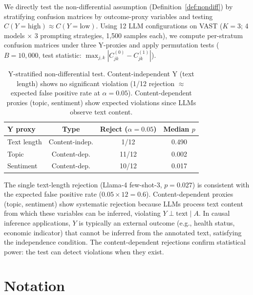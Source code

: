 We directly test the non-differential assumption (Definition~\ref{def:nondiff}) by stratifying confusion matrices by outcome-proxy variables and testing $C(Y{=}\text{high}) \approx C(Y{=}\text{low})$. Using 12 LLM configurations on VAST ($K{=}3$; 4 models $\times$ 3 prompting strategies, 1{,}500 samples each), we compute per-stratum confusion matrices under three Y-proxies and apply permutation tests ($B{=}10{,}000$, test statistic: $\max_{j,k} |C^{(0)}_{jk} - C^{(1)}_{jk}|$).

\begin{table}[h]
\centering
\small
\caption{Y-stratified non-differential test. Content-independent Y (text length) shows no significant violation (1/12 rejection $\approx$ expected false positive rate at $\alpha{=}0.05$). Content-dependent proxies (topic, sentiment) show expected violations since LLMs observe text content.}
\label{tab:y_stratified}
\begin{tabular}{lccc}
\toprule
\textbf{Y proxy} & \textbf{Type} & \textbf{Reject ($\alpha{=}0.05$)} & \textbf{Median $p$} \\
\midrule
Text length & Content-indep. & 1/12 & 0.490 \\
Topic & Content-dep. & 11/12 & 0.002 \\
Sentiment & Content-dep. & 10/12 & 0.017 \\
\bottomrule
\end{tabular}
\end{table}

The single text-length rejection (Llama-4 few-shot-3, $p{=}0.027$) is consistent with the expected false positive rate ($0.05 \times 12 = 0.6$). Content-dependent proxies (topic, sentiment) show systematic rejection because LLMs process text content from which these variables can be inferred, violating $Y \perp \text{text} \mid A$. In causal inference applications, $Y$ is typically an external outcome (e.g., health status, economic indicator) that cannot be inferred from the annotated text, satisfying the independence condition. The content-dependent rejections confirm statistical power: the test can detect violations when they exist.

\section{Notation}
\label{app:notation_table}


